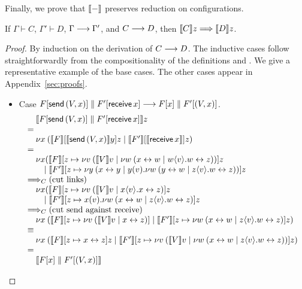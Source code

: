 \documentclass[oribibl,orivec,envcountsame]{llncs}
\begin{document}
Finally, we prove that $\llbracket - \rrbracket$ preserves reduction on configurations.
%
\begin{theorem}
\label{thm:gv-reduction-simulated}
If $\Gamma \vdash C$, $\Gamma' \vdash D$, $\Gamma \longrightarrow \Gamma'$, and $C \longrightarrow D$, then $\llbracket C \rrbracket z
\Longrightarrow \llbracket D \rrbracket z$.
\end{theorem}
\begin{proof}
  By induction on the derivation of $C \longrightarrow D$. The inductive cases follow straightforwardly from
  the compositionality of the definitions and . We give a representative
  example of the base cases. The other cases appear in Appendix~\ref{sec:proofs}.
\begin{itemize}
\item Case $F[\mathsf{send} \, (V,x)] \parallel F'[\mathsf{receive} \, x] \longrightarrow F[x]
  \parallel F'[(V,x)]$.
%
\[
\bl
\quad \tocp{\Fx[\gvconst{send} \app (V,x)] \parallel \Fx'[\gvconst{receive} \app x]}z \\
= \\
\quad \cut{x}{}
        {\tocp{\Fx}[\tocp{\gvconst{send} \app (V,x)}y]z}
        {\tocp{\Fx'}[\tocp{\gvconst{receive} \app x}]z} \\
= \\
\quad
  \nu x(
    {\tocp{\Fx}
      [z \mapsto \cut{v}{}{\tocp{V}v}
        {\cut{w}{}{\link{x}{w}}{w\sd{v}.\link{w}{z}}}]z} \\
\qquad \mid
    {\tocp{\Fx'}
       [z \mapsto \cut{y}{}
          {\link{x}{y}}
          {y(v).\cut{w}{}{\link{y}{w}}{z\sd{v}.\link{w}{z}}}]z} \\
\bigcrto (\text{cut links}) \\
\quad
  \nu x(
    {\tocp{\Fx}
       [z \mapsto \cut{v}{}{\tocp{V}v}
         {x\sd{v}.\link x z}]z} \\
\qquad \mid
    {\tocp{\Fx'}
       [z \mapsto x(v).\cut{w}{}{\link{x}{w}}{z\sd{v}.\link{w}{z}}]z} \\
\bigcrto (\text{cut send against receive}) \\
\quad
  \cut{x}{}
    {\tocp{\Fx}
       [z \mapsto
         \cut{v}{}{\tocp{V}v}{\link x z}]}
    {\tocp{\Fx'}
       [z \mapsto \cut{w}{}{\link{x}{w}}{z\sd{v}.\link{w}{z}}]z} \\
\equiv \\
\quad
  \cut{x}{}
    {\tocp{\Fx}[z \mapsto \link x z]z}
    {\tocp{\Fx'}[z \mapsto
      \cut{v}{}{\tocp{V}v}
        {\cut{w}{}{\link{x}{w}}
          {z\sd{v}.\link{w}{z}}}]z} \\
= \\
\quad \tocp{\Fx[x] \parallel \Fx'[(V,x)]} \\
\el
\]


\end{itemize}
\end{proof}
\end{document}
